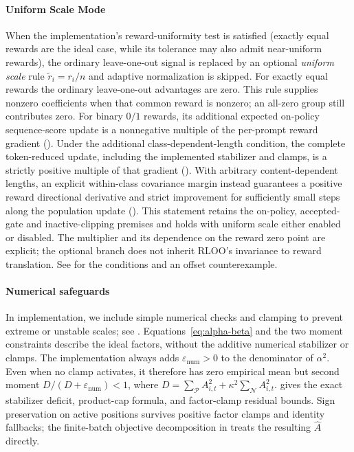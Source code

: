 \paragraph{Uniform Scale Mode}
When the implementation's reward-uniformity test is satisfied (exactly equal rewards
are the ideal case, while its tolerance may also admit near-uniform rewards), the
ordinary leave-one-out signal is replaced by an optional \emph{uniform scale} rule
$\tilde{r}_i = r_i/n$ and adaptive normalization is skipped. For exactly equal
rewards the ordinary leave-one-out advantages are zero. This rule supplies
nonzero coefficients when that common reward is nonzero; an all-zero group
still contributes zero. For binary $0/1$ rewards, its additional expected
on-policy sequence-score update is a nonnegative multiple of the
per-prompt reward gradient (). Under the
additional class-dependent-length condition, the complete token-reduced
update, including the implemented stabilizer and clamps, is a strictly
positive multiple of that gradient ().
With arbitrary content-dependent lengths, an explicit within-class
covariance margin instead guarantees a positive reward directional
derivative and strict improvement for sufficiently small steps along the
population update (). This statement
retains the on-policy, accepted-gate and inactive-clipping premises and
holds with uniform scale either enabled or disabled.
The multiplier and its dependence on the reward zero point are explicit; the
optional branch does not inherit RLOO's invariance to reward translation.
See  for the conditions and an offset counterexample.
\par
\paragraph{Numerical safeguards} In implementation, we include simple numerical checks and clamping to prevent extreme or unstable
scales; see . Equations~\eqref{eq:alpha-beta} and the two
moment constraints describe the ideal factors, without the additive numerical
stabilizer or clamps. The implementation always adds
$\varepsilon_{\mathrm{num}}>0$ to the denominator of $\alpha^2$.
Even when no clamp activates, it therefore has zero empirical mean but
second moment $D/(D+\varepsilon_{\mathrm{num}})<1$, where
$D=\sum_{\mathcal P}A_{i,t}^2+\kappa^2\sum_{\mathcal N}A_{i,t}^2$.
 gives the exact stabilizer deficit,
product-cap formula, and factor-clamp residual bounds. Sign preservation on
active positions survives positive factor clamps and identity fallbacks;
the finite-batch objective decomposition in 
treats the resulting $\hat A$ directly.


